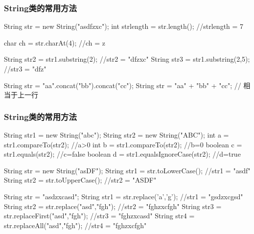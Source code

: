\begin{frame}[fragile]
  \frametitle{String类的常用方法}


  \begin{javaCode}
    String str = new String("asdfzxc");
    int strlength = str.length(); //strlength = 7
  \end{javaCode}


  \begin{javaCode}
    char ch = str.charAt(4); //ch = z
  \end{javaCode}


  \begin{javaCode}
    String str2 = str1.substring(2); //str2 = "dfzxc"
    String str3 = str1.substring(2,5); //str3 = "dfz"
  \end{javaCode}


  \begin{javaCode}
    String str = "aa".concat("bb").concat("cc");
    String str = "aa" + "bb" + "cc"; // 相当于上一行
  \end{javaCode}

\end{frame}

\begin{frame}[fragile]
  \frametitle{String类的常用方法}


  \begin{javaCode}
    String str1 = new String("abc");
    String str2 = new String("ABC");
    int a = str1.compareTo(str2);  //a>0
    int b = str1.compareTo(str2);  //b=0
    boolean c = str1.equals(str2); //c=false
    boolean d = str1.equalsIgnoreCase(str2); //d=true
  \end{javaCode}


  \begin{javaCode}
    String str = new String("asDF");
    String str1 = str.toLowerCase(); //str1 = "asdf"
    String str2 = str.toUpperCase(); //str2 = "ASDF"
  \end{javaCode}


  \begin{javaCode}
    String str = "asdzxcasd";
    String str1 = str.replace('a','g'); //str1 = "gsdzxcgsd"
    String str2 = str.replace("asd","fgh"); //str2 = "fghzxcfgh"
    String str3 = str.replaceFirst("asd","fgh"); //str3 = "fghzxcasd"
    String str4 = str.replaceAll("asd","fgh"); //str4 = "fghzxcfgh"
  \end{javaCode}

\end{frame}


